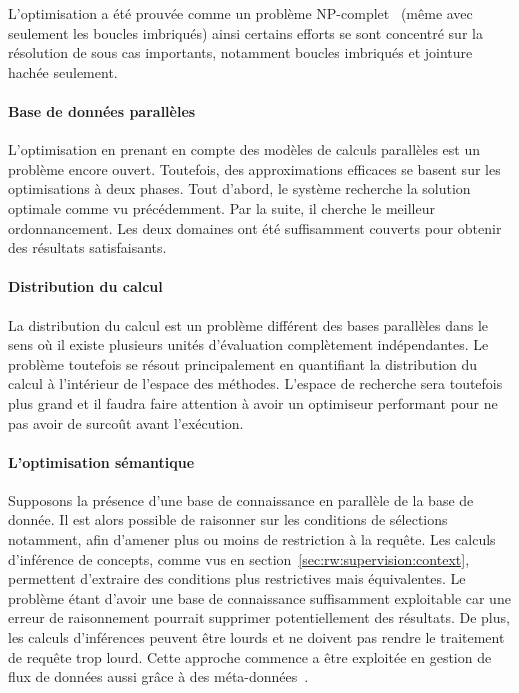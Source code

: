 L'optimisation a été prouvée comme un problème NP-complet~\cite{Ibaraki:join} (même avec seulement les boucles imbriqués) ainsi certains efforts se sont concentré sur la résolution de sous cas importants, notamment boucles imbriqués et jointure hachée seulement.

\paragraph*{Base de données parallèles}
L'optimisation en prenant en compte des modèles de calculs parallèles est un problème encore ouvert. Toutefois, des approximations efficaces se basent sur les optimisations à deux phases. Tout d'abord, le système recherche la solution optimale comme vu précédemment. Par la suite, il cherche le meilleur ordonnancement. Les deux domaines ont été suffisamment couverts pour obtenir des résultats satisfaisants.

\paragraph*{Distribution du calcul}
La distribution du calcul est un problème différent des bases parallèles dans le sens où il existe plusieurs unités d'évaluation complètement indépendantes. Le problème toutefois se résout principalement en quantifiant la distribution du calcul à l'intérieur de l'espace des méthodes. L'espace de recherche sera toutefois plus grand et il faudra faire attention à avoir un optimiseur performant pour ne pas avoir de surcoût avant l'exécution.

\paragraph*{L'optimisation sémantique}
Supposons la présence d'une base de connaissance en parallèle de la base de donnée. Il est alors possible de raisonner sur les conditions de sélections notamment, afin d'amener plus ou moins de restriction à la requête. Les calculs d'inférence de concepts, comme vus en section~\ref{sec:rw:supervision:context}, permettent d'extraire des conditions plus restrictives mais équivalentes. Le problème étant d'avoir une base de connaissance suffisamment exploitable car une erreur de raisonnement pourrait supprimer potentiellement des résultats. De plus, les calculs d'inférences peuvent être lourds et ne doivent pas rendre le traitement de requête trop lourd. Cette approche commence a être exploitée en gestion de flux de données aussi grâce à des méta-données~\cite{Ding:semantic}.

